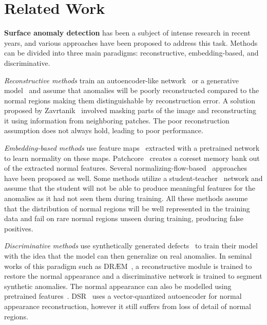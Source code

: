 \documentclass[10pt,twocolumn,letterpaper]{article}
\begin{document}
\section{Related Work}

\noindent\textbf{Surface anomaly detection} has been a subject of intense research in recent years, and various approaches have been proposed to address this task. Methods can be divided into three main paradigms: reconstructive, embedding-based, and discriminative.

\textit{Reconstructive methods} train an autoencoder-like network~\cite{ae-ssim, ae-2014, ZavrtanikInpainting} or a generative model~\cite{ganomaly, fanogan, AnnoDDPM, ddpm-noise-anomaly} and assume that anomalies will be poorly reconstructed compared to the normal regions making them distinguishable by reconstruction error. A solution proposed by Zavrtanik~\cite{ZavrtanikInpainting} involved masking parts of the image and reconstructing it using information from neighboring patches. The poor reconstruction assumption does not always hold, leading to poor performance.


\textit{Embedding-based methods} use feature maps~\cite{simplenet, NPad} extracted with a pretrained network to learn normality on these maps. Patchcore~\cite{patchcore} creates a coreset memory bank out of the extracted normal features. Several normalizing-flow-based~\cite{cflow-ad, cs-flow, fastflow, u-flow} approaches have been proposed as well. Some methods utilize a student-teacher~\cite{uninformed, reverse_dist, ast} network and assume that the student will not be able to produce meaningful features for the anomalies as it had not seen them during training. All these methods assume that the distribution of normal regions will be well represented in the training data and fail on rare normal regions unseen during training, producing false positives. 

\textit{Discriminative methods} use synthetically generated defects~\cite{draem,dsr,cutpaste,zhang2023destseg,memseg,simplenet} to train their model with the idea that the model can then generalize on real anomalies. In seminal works of this paradigm such as DR{\AE}M~\cite{draem}, a reconstructive module is trained to restore the normal appearance and a discriminative network is trained to segment synthetic anomalies. The normal appearance can also be modelled using pretrained features~\cite{zhang2023destseg,memseg,simplenet}. DSR~\cite{dsr} uses a vector-quantized autoencoder for normal appearance reconstruction, however it still suffers from loss of detail of normal regions.
\end{document}
